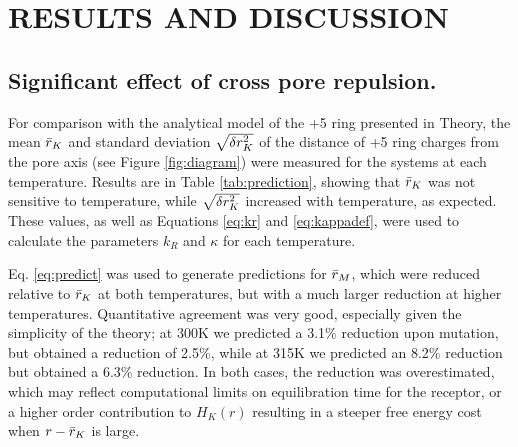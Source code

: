 \documentclass[9pt,twocolumn,twoside,lineno]{pnas-new}
\begin{document}
\section*{RESULTS AND DISCUSSION}
\subsection*{Significant effect of cross pore repulsion.}

For comparison with the analytical model of the +5 ring presented in Theory,  the mean $\bar{r}_{K}$ and standard deviation  $ \sqrt{\delta r^{2}_{K}} $ of the distance of +5 ring charges from the pore axis (see Figure \ref{fig:diagram})  were measured for the \WT systems at each temperature.  Results are in Table \ref{tab:prediction}, showing that $\bar{r}_{K}$ was not sensitive to temperature, while $\sqrt{\delta r^{2}_{K}}$ increased with temperature, as expected.  These values, as well as Equations \ref{eq:kr} and \ref{eq:kappadef}, were used to calculate the parameters $k_{R}$ and $\kappa$ for each temperature.  

Eq. \ref{eq:predict} was used to generate predictions for $\bar{r}_{M}$, which were reduced relative to $\bar{r}_{K}$ at both temperatures, but with a much larger reduction at higher temperatures.  Quantitative agreement was very good, especially given the simplicity of the theory; at 300K we predicted a 3.1\% reduction upon mutation, but obtained a reduction of 2.5\%, while at 315K we predicted an 8.2\% reduction but obtained a 6.3\% reduction.  In both cases, the reduction was overestimated, which may reflect computational limits on equilibration time for the \MT receptor, or a higher order contribution to $H_{K}(r)$ resulting in a steeper free energy cost when $r-\bar{r}_{K}$ is large.     
\end{document}
